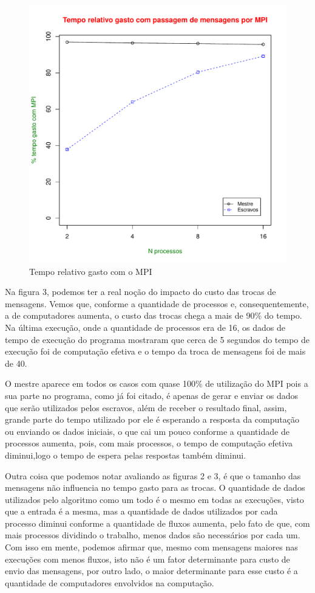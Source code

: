 \documentclass[12pt]{article}
\begin{document}
\begin{figure}[ht]
\centering
\includegraphics[width=.6\textwidth]{msgsp.pdf}
\caption{Tempo relativo gasto com o MPI}
\label{fig:desvios}
\end{figure}

Na figura 3, podemos ter a real noção do impacto do custo das trocas de mensagens. Vemos que, conforme a quantidade de processos e, consequentemente, a de computadores aumenta, o custo das trocas chega a mais de 90\% do tempo. Na última execução, onde a quantidade de processos era de 16, os dados de tempo de execução do programa mostraram que cerca de 5 segundos do tempo de execução foi de computação efetiva e o tempo da troca de mensagens foi de mais de 40.

O mestre aparece em todos os casos com quase 100\% de utilização do MPI pois a sua parte no programa, como já foi citado, é apenas de gerar e enviar os dados que serão utilizados pelos escravos, além de receber o resultado final, assim, grande parte do tempo utilizado por ele é esperando a resposta da computação ou enviando os dados iniciais, o que cai um pouco conforme a quantidade de processos aumenta, pois, com mais processos, o tempo de computação efetiva diminui,logo o tempo de espera pelas respostas também diminui.

Outra coisa que podemos notar avaliando as figuras 2 e 3, é que o tamanho das mensagens não influencia no tempo gasto para as trocas. O quantidade de dados utilizados pelo algoritmo como um todo é o mesmo em todas as execuções, visto que a entrada é a mesma, mas a quantidade de dados utilizados por cada processo diminui conforme a quantidade de fluxos aumenta, pelo fato de que, com mais processos dividindo o trabalho, menos dados são necessários por cada um. Com isso em mente, podemos afirmar que, mesmo com mensagens maiores nas execuções com menos fluxos, isto não é um fator determinante para custo de envio das mensagens, por outro lado, o maior determinante para esse custo é a quantidade de computadores envolvidos na computação.
\end{document}
